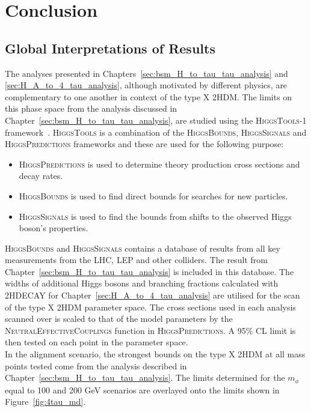 \chapter{Conclusion}
\label{sec:conclusion}

\section{Global Interpretations of Results}

The analyses presented in Chapters~\ref{sec:bsm_H_to_tau_tau_analysis} and \ref{sec:H_A_to_4_tau_analysis}, although motivated by different physics, are complementary to one another in context of the type X 2HDM.
The limits on this phase space from the analysis discussed in Chapter~\ref{sec:bsm_H_to_tau_tau_analysis}, are studied using the \textsc{HiggsTools-1} framework~\cite{}.
\textsc{HiggsTools} is a combination of the \textsc{HiggsBounds}, \textsc{HiggsSignals} and \textsc{HiggsPredictions} frameworks and these are used for the following purpose:

\begin{itemize}
\item \textsc{HiggsPredictions} is used to determine theory production cross sections and decay rates.
\item \textsc{HiggsBounds} is used to find direct bounds for searches for new particles.
\item \textsc{HiggsSignals} is used to find the bounds from shifts to the observed Higgs boson's properties.
\end{itemize}

\textsc{HiggsBounds} and \textsc{HiggsSignals} contains a database of results from all key measurements from the LHC, LEP and other colliders.
The result from Chapter~\ref{sec:bsm_H_to_tau_tau_analysis} is included in this database.
The widths of additional Higgs bosons and branching fractions calculated with \textsc{2HDECAY} for Chapter~\ref{sec:H_A_to_4_tau_analysis} are utilised for the scan of the type X 2HDM parameter space.
The cross sections used in each analysis scanned over is scaled to that of the model parameters by the \textsc{NeutralEffectiveCouplings} function in \textsc{HiggsPredictions}.
A 95\% CL limit is then tested on each point in the parameter space. \\

In the alignment scenario, the strongest bounds on the type X 2HDM at all mass points tested come from the analysis described in Chapter~\ref{sec:bsm_H_to_tau_tau_analysis}.
The limits determined for the $m_{\phi}$ equal to 100 and 200 GeV scenarios are overlayed onto the limits shown in Figure~\ref{fig:4tau_md}. \\

